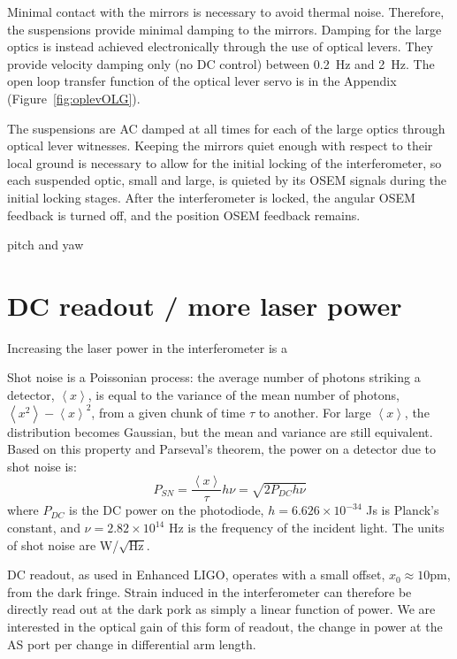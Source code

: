 Minimal contact with the mirrors is necessary to avoid thermal
noise. Therefore, the suspensions provide minimal damping to the
mirrors. Damping for the large optics is instead achieved
electronically through the use of optical levers. They provide
velocity damping only (no DC control) between 0.2~Hz and 2~Hz. The
open loop transfer function of the optical lever servo is in the
Appendix (Figure~\ref{fig:oplevOLG}).

The suspensions are AC damped at all times for each of the large
optics through optical lever witnesses. Keeping the mirrors quiet
enough with respect to their local ground is necessary to allow for
the initial locking of the interferometer, so each suspended optic,
small and large, is quieted by its OSEM signals during the initial
locking stages. After the interferometer is locked, the angular OSEM
feedback is turned off, and the position OSEM feedback remains.

pitch and yaw



\section{DC readout / more laser power}
Increasing the laser power in the interferometer is a 

Shot noise is a Poissonian process: the average number of photons
striking a detector, $\left<x\right>$, is equal to the variance of the
mean number of photons, $\left<x^2\right> - \left<x\right>^2$, from a
given chunk of time $\tau$ to another. For large $\left<x\right>$, the
distribution becomes Gaussian, but the mean and variance are still
equivalent. Based on this property and Parseval's theorem, the power
on a detector due to shot noise is:
\begin{equation}
P_{SN} = \frac{\left<x\right>}{\tau} h \nu = \sqrt{2 P_{DC} h \nu}
\end{equation}
where $P_{DC}$ is the DC power on the photodiode, $h = 6.626 \times
10^{-34}$ Js is Planck's constant, and $\nu = 2.82 \times 10^{14}$ Hz
is the frequency of the incident light. The units of shot noise are
W/$\sqrt{\mathrm{Hz}}$.

DC readout, as used in Enhanced LIGO, operates with a small offset,
$x_0 \approx 10 \mathrm{pm}$, from the dark fringe. Strain induced in the
interferometer can therefore be directly read out at the dark pork as
simply a linear function of power. We are interested in the optical
gain of this form of readout, the change in power at the AS port per
change in differential arm length. 


